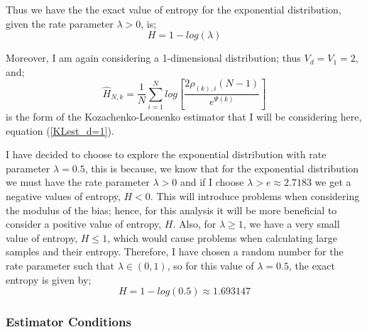 \documentclass{article}
\begin{document}
Thus we have the the exact value of entropy for the exponential distribution, given the rate parameter $\lambda > 0$, is;
\begin{equation} \label{ExpEnt}
H = 1 - log(\lambda)
\end{equation}

Moreover, I am again considering a 1-dimensional distribution; thus $V_{d} = V_{1} = 2$, and;
\begin{equation}
\hat{H}_{N, k} =  \frac{1}{N} \sum_{i=1}^{N} log \left[ \frac{2\rho_{(k),i}(N-1)}{e^{\Psi(k)}} \right]\nonumber
\end{equation}
is the form of the Kozachenko-Leonenko estimator that I will be considering here, equation (\ref{KLest_d=1}).

I have decided to choose to explore the exponential distribution with rate parameter $\lambda = 0.5$, this is because, we know that for the exponential distribution we must have the rate parameter $\lambda >0$ and if I choose $\lambda > e \approx 2.7183$ we get a negative values of entropy, $H < 0$. This will introduce problems when considering the modulus of the bias; hence, for this analysis it will be more beneficial to consider a positive value of entropy, $H$. Also, for $\lambda \geq 1$, we have a very small value of entropy, $H \leq 1$, which would cause problems when calculating large samples and their entropy. Therefore, I have chosen a random number for the rate parameter such that $\lambda \in (0, 1)$, so for this value of $\lambda=0.5$, the exact entropy is given by;
\begin{equation} \label{exponential_exact}
H = 1 - log(0.5) \approx 1.693147
\end{equation}



\subsubsection{Estimator Conditions} \label{E_Conditions}
\end{document}
